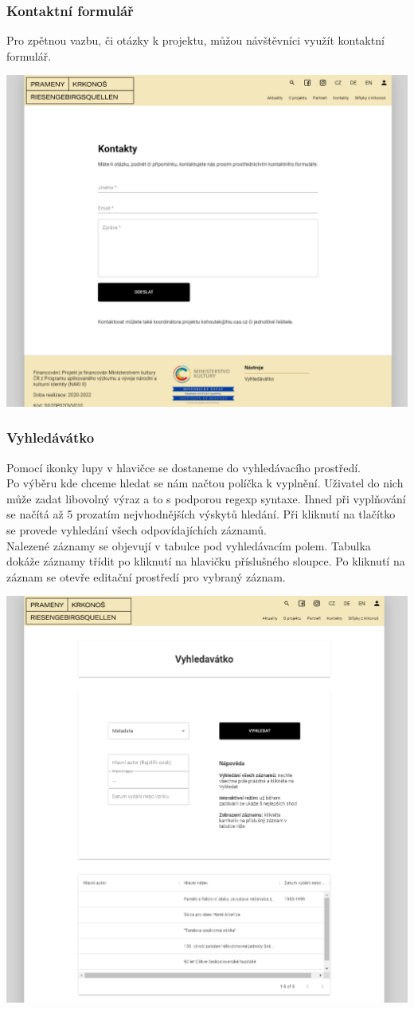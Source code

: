 \subsubsection{Kontaktní formulář}
Pro zpětnou vazbu, či otázky k projektu, můžou návštěvníci využít kontaktní formulář.
\begin{center}
	\includegraphics[width=.8\textwidth]{img/contactScene.png}
\end{center}

\subsubsection{Vyhledávátko}
Pomocí ikonky lupy v hlavičce se dostaneme do vyhledávacího prostředí.\\
Po výběru kde chceme hledat se nám načtou políčka k vyplnění. Uživatel do nich může zadat
libovolný výraz a to s podporou regexp syntaxe. Ihned při vyplňování se načítá až 5
prozatím nejvhodnějších výskytů hledání. Při kliknutí na tlačítko  se provede
vyhledání všech odpovídajíchích záznamů.\\
Nalezené záznamy se objevují v tabulce pod vyhledávacím polem.
Tabulka dokáže záznamy třídit po kliknutí na hlavičku příslušného sloupce.
Po kliknutí na záznam se otevře editační prostředí pro vybraný záznam.
\begin{center}
	\includegraphics[width=.8\textwidth]{img/searchScene.png}
\end{center}

